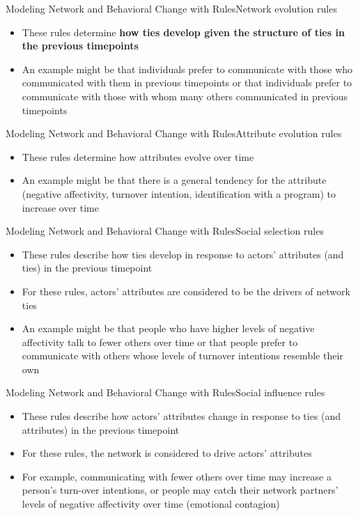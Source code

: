 \documentclass[notes, aspectratio=1610]{beamer}
\begin{document}
\begin{frame}{Modeling Network and Behavioral Change with Rules}{Network evolution rules}
	\begin{itemize}
	\item These rules determine \textbf{how ties develop given the structure of ties in 
	the previous timepoints}
	\item An example might be that individuals prefer 
	to communicate with those who communicated with them in previous 
	timepoints or that individuals prefer to communicate with those with 
	whom many others communicated in previous timepoints
	\end{itemize}
\end{frame}


\begin{frame}{Modeling Network and Behavioral Change with Rules}{Attribute evolution rules}
	\begin{itemize}
		\item  These rules determine how attributes evolve over time
		\item An example might be that there is a general tendency for 
		the attribute (negative affectivity, turnover intention, 
		identification with a program) to increase over time
	\end{itemize}
\end{frame}

\begin{frame}{Modeling Network and Behavioral Change with Rules}{Social selection rules}
	\begin{itemize}
		\item These rules describe how ties develop in response to 
		actors' attributes (and ties) in the previous timepoint
		\item For these rules, actors' attributes are considered to be 
		the drivers of network ties
		\item An example might be that people who have higher levels of 
		negative affectivity talk to fewer others over time or that
		people prefer to communicate with others whose levels of 
		turnover intentions resemble their own
	\end{itemize}
\end{frame}

\begin{frame}{Modeling Network and Behavioral Change with Rules}{Social influence rules}
\begin{itemize}
	\item These rules describe how actors' attributes change in response 
	to ties (and attributes) in the previous timepoint
	\item For these rules, the network is considered to drive actors' 
	attributes
	\item For example, communicating with fewer others over time may 
	increase a person's turn-over intentions, or people may catch their 
	network partners' levels of negative affectivity over time (emotional 
	contagion)
\end{itemize}
\end{frame}
\end{document}

